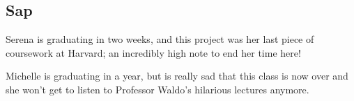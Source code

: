 \documentclass[preprint,review,12pt]{cs262}
\begin{document}
\subsection{Sap}

Serena is graduating in two weeks, and this project was her last piece of coursework at Harvard; an incredibly high note to end her time here! 

Michelle is graduating in a year, but is really sad that this class is now over and she won't get to listen to Professor Waldo's hilarious lectures anymore.







% 
% 
% 
% 
% 
% 
% 
% 
% 
% 
% 
% 


\end{document}
